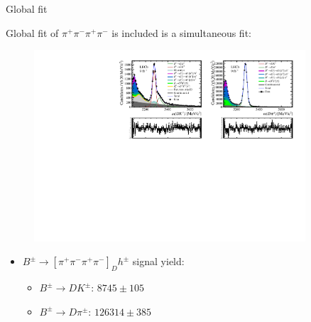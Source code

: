 \documentclass[xcolor={dvipsnames}]{beamer}
\begin{document}
\begin{frame}{Global fit}
  \begin{center}
    {\large Global fit of $\pi^+\pi^-\pi^+\pi^-$ is included is a simultaneous fit:}
  \end{center}
  \begin{figure}
    \centering
    \includegraphics[width = 0.9\textwidth,trim={0 0 0 0},clip=true]{Plots/d2pipipipi_fiveL_allDP.pdf}
  \end{figure}
  \vspace{-0.5cm}
  \begin{itemize}
    \item{$B^\pm\to[\pi^+\pi^-\pi^+\pi^-]_Dh^\pm$ signal yield:}
    \begin{itemize}
      \item{$B^\pm\to DK^\pm$: $8745 \pm 105$}
      \item{$B^\pm\to D\pi^\pm$: $126314 \pm 385$}
    \end{itemize}
  \end{itemize}
\end{frame}
\end{document}
